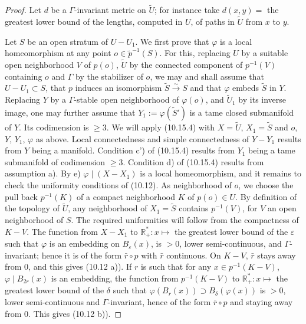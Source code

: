 \documentclass[12pt,a4paper]{article}
\theoremstyle{plain}
\theoremstyle{definition}
\theoremstyle{remark}
\begin{document}
\begin{proof}
Let $d$ be a $\Gamma$-invariant metric on $\widetilde{U}$; for instance take $d(x, y) =$ the greatest lower bound of the lengths, computed in $U$, of paths in $\widetilde{U}$ from $x$ to $y$.

Let $S$ be an open stratum of $U - U_1$. We first prove that $\varphi$ is a local homeomorphism at any point $o \in \widetilde{p}^{-1}(S)$. For this, replacing $U$ by a suitable open neighborhood $V$ of $p(o)$, $\widetilde{U}$ by the connected component of $p^{-1}(V)$ containing $o$ and $\Gamma$ by the stabilizer of $o$, we may and shall assume that $U - U_1 \subset S$, that $p$ induces an isomorphism $\widetilde{S} \xrightarrow{\sim} S$ and that $\varphi$ embeds $\widetilde{S}$ in $Y$. Replacing $Y$ by a $\Gamma$-stable open neighborhood of $\varphi(o)$, and $\widetilde{U}_1$ by its inverse image, one may further assume that $Y_1 := \varphi(\widetilde{S}')$ is a tame closed submanifold of $Y$. Its codimension is $\geqslant 3$. We will apply (10.15.4) with $X = \widetilde{U}$, $X_1 = \widetilde{S}$ and $o$, $Y$, $Y_1$, $\varphi$ as above. Local connectedness and simple connectedness of $Y - Y_1$ results from $Y$ being a manifold. Condition c') of (10.15.4) results from $Y_1$ being a tame submanifold of codimension $\geqslant 3$. Condition d) of (10.15.4) results from assumption a). By e) $\varphi \mid (X - X_1)$ is a local homeomorphism, and it remains to check the uniformity conditions of (10.12). As neighborhood of $o$, we choose the pull back $p^{-1}(K)$ of a compact neighborhood $K$ of $p(o) \in U$. By definition of the topology of $\widetilde{U}$, any neighborhood of $X_1 = \widetilde{S}$ contains $p^{-1}(V)$, for $V$ an open neighborhood of $S$. The required uniformities will follow from the compactness of $K - V$. The function from $X - X_1$ to $\mathbb{R}_+^* : x \mapsto$ the greatest lower bound of the $\varepsilon$ such that $\varphi$ is an embedding on $B_\varepsilon(x)$, is $> 0$, lower semi-continuous, and $\Gamma$-invariant; hence it is of the form $\bar{r} \circ p$ with $\bar{r}$ continuous. On $K - V$, $\bar{r}$ stays away from $0$, and this gives (10.12 a)). If $r$ is such that for any $x \in p^{-1}(K - V)$, $\varphi \mid B_{2r}(x)$ is an embedding, the function from $p^{-1}(K - V)$ to $\mathbb{R}_+^* : x \mapsto$ the greatest lower bound of the $\delta$ such that $\varphi(B_r(x)) \supset B_\delta(\varphi(x))$ is $> 0$, lower semi-continuous and $\Gamma$-invariant, hence of the form $\bar{r} \circ p$ and staying away from $0$. This gives (10.12 b)).


\end{proof}
\end{document}
